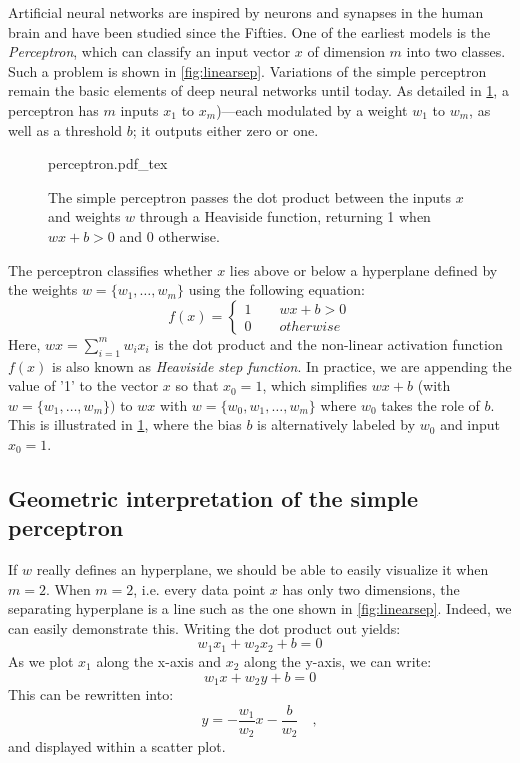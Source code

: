 Artificial neural networks are inspired by neurons and synapses in the human brain and have been studied since the Fifties. One of the earliest models is the \textsl{Perceptron}, which can classify an input vector $x$ of dimension $m$ into two classes. Such a problem is shown in \cref{fig:linearsep}. Variations of the simple perceptron remain the basic elements of deep neural networks until today.
%
As detailed in \cref{fig:perceptron}, a perceptron has $m$ inputs $x_1$ to $x_m$)---each modulated by a weight $w_1$ to $w_m$, as well as a threshold $b$; it outputs either zero or one.

\begin{figure}
    \centering
    \def\svgwidth{0.66\textwidth}
    {perceptron.pdf_tex}
    \caption{The simple perceptron passes the dot product between the inputs $x$ and weights $w$ through a Heaviside function, returning 1 when $wx+b>0$ and 0 otherwise.}\label{fig:perceptron}
\end{figure}

The perceptron classifies whether $x$ lies above or below a hyperplane defined by the weights $w=\{w_1, \ldots, w_m\}$ using the following equation:
%
\begin{equation} \label{eq:heaviside}
f(x)=\begin{cases}
1 \qquad wx+b > 0\\
0 \qquad otherwise
\end{cases}
\end{equation}
%
Here, $wx=\sum_{i=1}^mw_ix_i$ is the dot product and the non-linear activation function $f(x)$ is also known as \textsl{Heaviside step function}. In practice, we are appending the value of '1' to the vector $x$ so that $x_0=1$, which simplifies $wx+b$ (with $w=\{w_1, \ldots, w_m\})$ to $wx$ with $w=\{w_0, w_1, \ldots, w_m\}$ where $w_0$ takes the role of $b$. This is illustrated in \cref{fig:perceptron}, where the bias $b$ is alternatively labeled by $w_0$ and input $x_0=1$.

\subsection{Geometric interpretation of the simple perceptron}

If $w$ really defines an hyperplane, we should be able to easily visualize it when $m=2$. When $m=2$, i.e. every data point $x$ has only two dimensions, the separating hyperplane is a line such as the one shown in \cref{fig:linearsep}.
Indeed, we can easily demonstrate this. Writing the dot product out yields:
\begin{equation}
w_1x_1+w_2x_2+b=0
\end{equation}
As we plot $x_1$ along the x-axis and $x_2$ along the y-axis, we can write:
\begin{equation}
w_1x+w_2y+b=0
\end{equation}
This can be rewritten into:
\begin{equation}
y=-\frac{w_1}{w_2}x-\frac{b}{w_2}\quad ,
\end{equation}
and displayed within a scatter plot.

